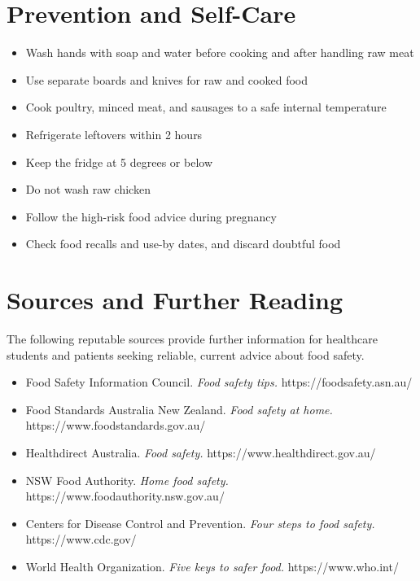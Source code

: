 \section*{Prevention and Self-Care}
\begin{itemize}
    \item Wash hands with soap and water before cooking and after handling raw meat
    \item Use separate boards and knives for raw and cooked food
    \item Cook poultry, minced meat, and sausages to a safe internal temperature
    \item Refrigerate leftovers within 2 hours
    \item Keep the fridge at 5 degrees or below
    \item Do not wash raw chicken
    \item Follow the high-risk food advice during pregnancy
    \item Check food recalls and use-by dates, and discard doubtful food
\end{itemize}

\section*{Sources and Further Reading}
The following reputable sources provide further information for healthcare students and patients seeking reliable, current advice about food safety.
\begin{itemize}
    \item Food Safety Information Council. \textit{Food safety tips.} https://foodsafety.asn.au/
    \item Food Standards Australia New Zealand. \textit{Food safety at home.} https://www.foodstandards.gov.au/
    \item Healthdirect Australia. \textit{Food safety.} https://www.healthdirect.gov.au/
    \item NSW Food Authority. \textit{Home food safety.} https://www.foodauthority.nsw.gov.au/
    \item Centers for Disease Control and Prevention. \textit{Four steps to food safety.} https://www.cdc.gov/
    \item World Health Organization. \textit{Five keys to safer food.} https://www.who.int/
\end{itemize}

